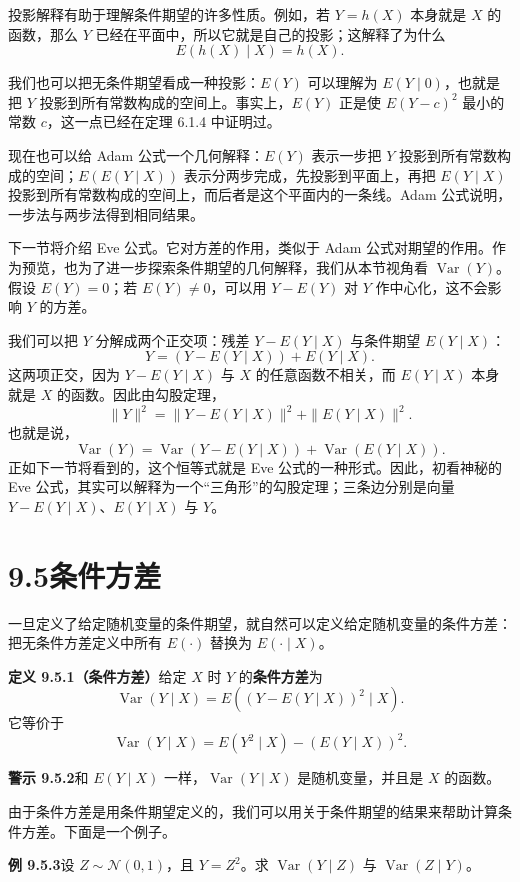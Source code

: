 \documentclass[UTF8, 12pt, fontset=fandol, oneside]{ctexart}
\begin{document}
投影解释有助于理解条件期望的许多性质。例如，若 $Y=h(X)$ 本身就是 $X$ 的函数，那么 $Y$ 已经在平面中，所以它就是自己的投影；这解释了为什么
\[
  E(h(X)\mid X)=h(X).
\]

我们也可以把无条件期望看成一种投影：$E(Y)$ 可以理解为 $E(Y\mid 0)$，也就是把 $Y$ 投影到所有常数构成的空间上。事实上，$E(Y)$ 正是使 $E(Y-c)^2$ 最小的常数 $c$，这一点已经在定理 6.1.4 中证明过。

现在也可以给 Adam 公式一个几何解释：$E(Y)$ 表示一步把 $Y$ 投影到所有常数构成的空间；$E(E(Y\mid X))$ 表示分两步完成，先投影到平面上，再把 $E(Y\mid X)$ 投影到所有常数构成的空间上，而后者是这个平面内的一条线。Adam 公式说明，一步法与两步法得到相同结果。

下一节将介绍 Eve 公式。它对方差的作用，类似于 Adam 公式对期望的作用。作为预览，也为了进一步探索条件期望的几何解释，我们从本节视角看 $\operatorname{Var}(Y)$。假设 $E(Y)=0$；若 $E(Y)\ne0$，可以用 $Y-E(Y)$ 对 $Y$ 作中心化，这不会影响 $Y$ 的方差。

我们可以把 $Y$ 分解成两个正交项：残差 $Y-E(Y\mid X)$ 与条件期望 $E(Y\mid X)$：
\[
  Y=(Y-E(Y\mid X))+E(Y\mid X).
\]
这两项正交，因为 $Y-E(Y\mid X)$ 与 $X$ 的任意函数不相关，而 $E(Y\mid X)$ 本身就是 $X$ 的函数。因此由勾股定理，
\[
  \|Y\|^2=\|Y-E(Y\mid X)\|^2+\|E(Y\mid X)\|^2.
\]
也就是说，
\[
  \operatorname{Var}(Y)
  =\operatorname{Var}(Y-E(Y\mid X))+\operatorname{Var}(E(Y\mid X)).
\]
正如下一节将看到的，这个恒等式就是 Eve 公式的一种形式。因此，初看神秘的 Eve 公式，其实可以解释为一个“三角形”的勾股定理；三条边分别是向量 $Y-E(Y\mid X)$、$E(Y\mid X)$ 与 $Y$。

\section*{9.5\quad 条件方差}

一旦定义了给定随机变量的条件期望，就自然可以定义给定随机变量的条件方差：把无条件方差定义中所有 $E(\cdot)$ 替换为 $E(\cdot\mid X)$。

\noindent\textbf{定义 9.5.1（条件方差）}\quad 给定 $X$ 时 $Y$ 的\textbf{条件方差}为
\[
  \operatorname{Var}(Y\mid X)=E((Y-E(Y\mid X))^2\mid X).
\]
它等价于
\[
  \operatorname{Var}(Y\mid X)=E(Y^2\mid X)-(E(Y\mid X))^2.
\]

\noindent\textbf{警示 9.5.2}\quad 和 $E(Y\mid X)$ 一样，$\operatorname{Var}(Y\mid X)$ 是随机变量，并且是 $X$ 的函数。

由于条件方差是用条件期望定义的，我们可以用关于条件期望的结果来帮助计算条件方差。下面是一个例子。

\noindent\textbf{例 9.5.3}\quad 设 $Z\sim\mathcal N(0,1)$，且 $Y=Z^2$。求 $\operatorname{Var}(Y\mid Z)$ 与 $\operatorname{Var}(Z\mid Y)$。
\end{document}
